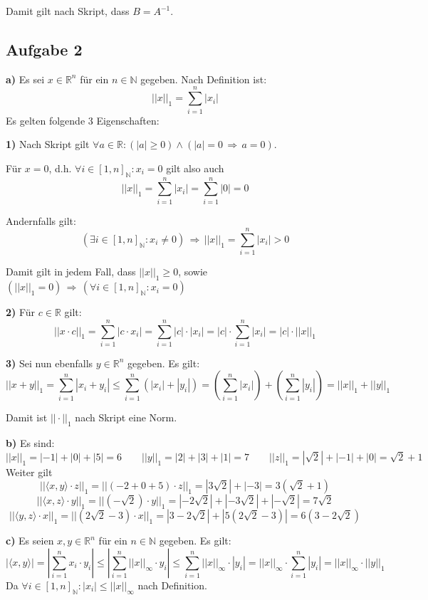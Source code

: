 \documentclass[a4paper,graphics,11pt]{article}
\newcommand{\aufgabe}[1]{\subsection*{Aufgabe #1}}
\begin{document}
Damit gilt nach Skript, dass $B = A^{-1}$.
\newpage
\aufgabe{2}
\textbf{a)}
Es sei $x \in \mathbb{R}^n$ für ein $n \in \mathbb{N}$ gegeben. Nach Definition ist:
$$
	||x||_1 = \sum_{i=1}^{n} |x_i|
$$
Es gelten folgende 3 Eigenschaften:

\textbf{1)}
Nach Skript gilt $\forall a \in \mathbb{R}\colon \left(|a| \geq 0\right)\land\left(|a| = 0 \,\Longrightarrow\, a = 0\right)$.

Für $x = 0$, d.h. $\forall i \in [1,n]_\mathbb{N}\colon x_i = 0$ gilt also auch
$$
	||x||_1 = \sum_{i=1}^{n} |x_i| = \sum_{i=1}^{n} |0| = 0
$$

Andernfalls gilt:
$$
	\left(\exists i \in [1,n]_\mathbb{N}\colon x_i \neq 0\right) \,\Longrightarrow\, ||x||_1 = \sum_{i=1}^{n} |x_i| > 0
$$

Damit gilt in jedem Fall, dass $||x||_1 \geq 0$, sowie $\left(||x||_1 = 0\right) \,\Longrightarrow\, \left(\forall i \in [1,n]_\mathbb{N}\colon x_i = 0\right)$

\textbf{2)}
Für $c \in \mathbb{R}$ gilt:
$$
	||x\cdot c||_1
	= \sum_{i=1}^{n} |c\cdot x_i|
	= \sum_{i=1}^{n} |c|\cdot |x_i|
	= |c|\cdot \sum_{i=1}^{n} |x_i|
	= |c|\cdot ||x||_1
$$

\textbf{3)}
Sei nun ebenfalls $y \in \mathbb{R}^n$ gegeben. Es gilt:
$$
	||x+y||_1
	= \sum_{i=1}^{n} |x_i+y_i|
	\leq \sum_{i=1}^{n} \left(|x_i|+|y_i|\right)
	= \left(\sum_{i=1}^{n} |x_i|\right) + \left(\sum_{i=1}^{n} |y_i|\right)
	= ||x||_1 + ||y||_1
$$

Damit ist $||\cdot||_1$ nach Skript eine Norm.

\textbf{b)}
Es sind:
$$
	||x||_1 = |-1|+|0|+|5| = 6 \qquad ||y||_1 = |2|+|3|+|1| = 7 \qquad ||z||_1 = |\sqrt{2}|+|-1|+|0| = \sqrt{2}+1
$$
Weiter gilt
$$
	||\langle x, y\rangle\cdot z||_1
	= ||\left(-2+0+5\right) \cdot z||_1
	= |3\sqrt{2}|+|-3|
	= 3(\sqrt{2} +1)
$$
$$
	||\langle x, z\rangle\cdot y||_1
	= ||\left(-\sqrt{2}\right) \cdot y||_1
	= |-2\sqrt{2}|+|-3\sqrt{2}|+|-\sqrt{2}|
	= 7\sqrt{2}
$$
$$
	||\langle y, z\rangle\cdot x||_1
	= ||\left(2\sqrt{2}-3\right) \cdot x||_1
	= |3-2\sqrt{2}|+|5(2\sqrt{2}-3)|
	= 6(3-2\sqrt{2})
$$

\newpage
\textbf{c)}
Es seien $x,y \in \mathbb{R}^n$ für ein $n \in \mathbb{N}$ gegeben. Es gilt:
$$
	|\langle x,y\rangle|
	= \left|\sum_{i=1}^{n} x_i\cdot y_i\right|
	\leq \left|\sum_{i=1}^{n} ||x||_\infty\cdot y_i\right|
	\leq \sum_{i=1}^{n} ||x||_\infty \cdot |y_i|
	= ||x||_\infty \cdot \sum_{i=1}^{n} |y_i|
	= ||x||_\infty \cdot ||y||_1
$$
Da $\forall i \in [1,n]_\mathbb{N}\colon |x_i| \leq ||x||_\infty$ nach Definition.
\end{document}
